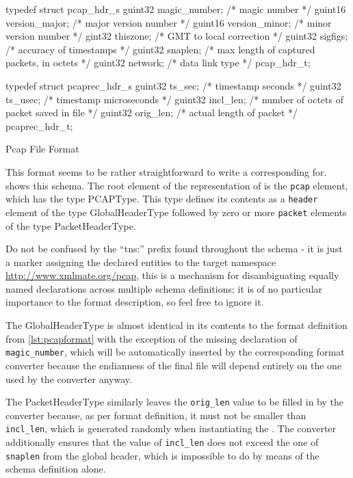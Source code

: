 \begin{listing}[H]
\centering
\begin{cppcode}
typedef struct pcap_hdr_s {
        guint32 magic_number;   /* magic number */
        guint16 version_major;  /* major version number */
        guint16 version_minor;  /* minor version number */
        gint32  thiszone;       /* GMT to local correction */
        guint32 sigfigs;        /* accuracy of timestamps */
        guint32 snaplen;        /* max length of captured packets, in octets */
        guint32 network;        /* data link type */
} pcap_hdr_t;

typedef struct pcaprec_hdr_s {
        guint32 ts_sec;         /* timestamp seconds */
        guint32 ts_usec;        /* timestamp microseconds */
        guint32 incl_len;       /* number of octets of packet saved in file */
        guint32 orig_len;       /* actual length of packet */
} pcaprec_hdr_t;
\end{cppcode}
\caption{Pcap File Format}
\label{lst:pcapformat}
\end{listing}

This format seems to be rather straightforward to write a corresponding \xsd for.  shows
this schema. The root element of the \xml representation of \pcap is the \texttt{pcap} element, which has the
type PCAPType. This type defines its contents as a \texttt{header} element of the type GlobalHeaderType
followed by zero or more \texttt{packet} elements of the type PacketHeaderType. 

Do not be confused by the ``tns:'' prefix found throughout the schema - it is just a marker assigning the
declared entities to the target namespace \url{http://www.xmlmate.org/pcap}, this is a mechanism for
disambiguating equally named declarations across multiple schema definitions; it is of no particular
importance to the format description, so feel free to ignore it. 

The GlobalHeaderType is almost identical in its contents to the format definition from \cref{lst:pcapformat}
with the exception of the missing declaration of \texttt{magic\_number}, which will be automatically inserted
by the corresponding format converter because the endianness of the final \pcap file will depend entirely on
the one used by the converter anyway.

The PacketHeaderType similarly leaves the \texttt{orig\_len} value to be filled in by the converter because, as
per format definition, it must not be smaller than \texttt{incl\_len}, which is generated randomly when
instantiating the \xml. The converter additionally ensures that the value of \texttt{incl\_len} does not exceed
the one of \texttt{snaplen} from the global header, which is impossible to do by means of the schema
definition alone.

